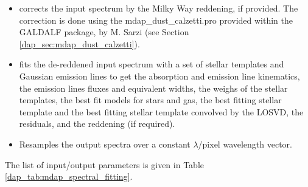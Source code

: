 \documentclass[11pt]{book}
\begin{document}
\begin{itemize}

\item corrects the input spectrum by the Milky Way reddening, if
  provided. The correction is done using the mdap\_dust\_calzetti.pro
  provided within the GALDALF package, by M. Sarzi (see Section
  \ref{dap_sec:mdap_dust_calzetti}).

\item fits the de-reddened input spectrum with a set of stellar
  templates and Gaussian emission lines to get the absorption and
  emission line kinematics, the emission lines fluxes and equivalent
  widths, the weighs of the stellar templates, the best fit models for
  stars and gas, the best fitting stellar template and the best
  fitting stellar template convolved by the LOSVD, the residuals, and
  the reddening (if required).

\item Resamples the output spectra over a constant $\lambda$/pixel
  wavelength vector.

\end{itemize}


The list of input/output parameters is given in Table
\ref{dap_tab:mdap_spectral_fitting}.
\end{document}
